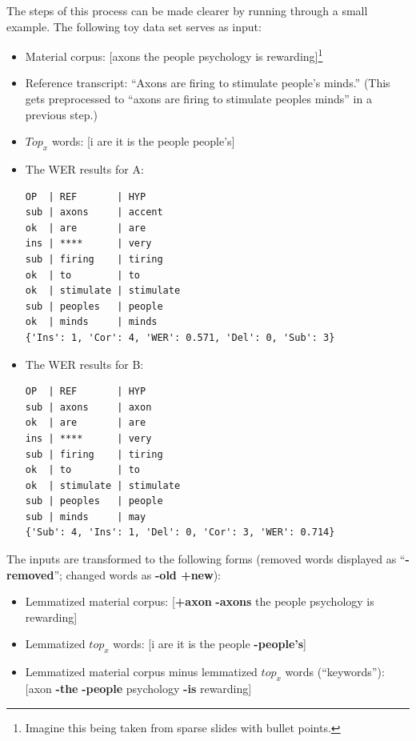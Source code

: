 \documentclass[]{article}
\providecommand{\tightlist}{%
  \setlength{\itemsep}{0pt}\setlength{\parskip}{0pt}}
\begin{document}
The steps of this process can be made clearer by running through a small
example. The following toy data set serves as input:

\begin{itemize}
\item
  Material corpus: {[}axons the people psychology is
  rewarding{]}\footnote{Imagine this being taken from sparse slides with
    bullet points.}
\item
  Reference transcript: ``Axons are firing to stimulate people's
  minds.'' (This gets preprocessed to ``axons are firing to stimulate
  peoples minds'' in a previous step.)
\item
  \(Top_x\) words: {[}i are it is the people people's{]}
\item
  The WER results for A:

\begin{verbatim}
OP  | REF       | HYP
sub | axons     | accent
ok  | are       | are
ins | ****      | very
sub | firing    | tiring
ok  | to        | to
ok  | stimulate | stimulate
sub | peoples   | people
ok  | minds     | minds
{'Ins': 1, 'Cor': 4, 'WER': 0.571, 'Del': 0, 'Sub': 3}
\end{verbatim}
\item
  The WER results for B:

\begin{verbatim}
OP  | REF       | HYP
sub | axons     | axon
ok  | are       | are
ins | ****      | very
sub | firing    | tiring
ok  | to        | to
ok  | stimulate | stimulate
sub | peoples   | people
sub | minds     | may
{'Sub': 4, 'Ins': 1, 'Del': 0, 'Cor': 3, 'WER': 0.714}
\end{verbatim}
\end{itemize}

The inputs are transformed to the following forms (removed words
displayed as ``\textbf{-removed}''; changed words as \textbf{-old
+new}):

\begin{itemize}
\tightlist
\item
  Lemmatized material corpus: {[}\textbf{+axon} \textbf{-axons} the
  people psychology is rewarding{]}
\item
  Lemmatized \(top_x\) words: {[}i are it is the people
  \textbf{-people's}{]}
\item
  Lemmatized material corpus minus lemmatized \(top_x\) words
  (``keywords''): {[}axon \textbf{-the} \textbf{-people} psychology
  \textbf{-is} rewarding{]}
\end{itemize}
\end{document}
